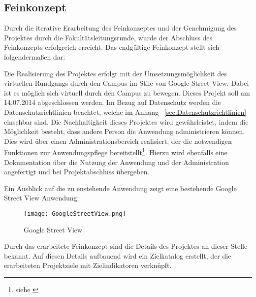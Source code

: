 \subsection{Feinkonzept}
\label{sec:Feinkonzept}

Durch die iterative Erarbeitung des Feinkonzeptes und der Genehmigung des
Projektes durch die Fakultätsleitungsrunde, wurde der Abschluss des Feinkonzepts
erfolgreich erreicht. Das endgültige Feinkonzept stellt sich folgendermaßen dar:

Die Realisierung des Projektes erfolgt mit der Umsetzungsmöglichkeit des
virtuellen Rundgangs durch den Campus im Stile von Google Street View. Dabei ist
es möglich sich virtuell durch den Campus zu bewegen. Dieses Projekt soll am
14.07.2014 abgeschlossen werden. Im Bezug auf Datenschutz werden die
Datenschutzrichtlinien beachtet, welche im Anhang ~\ref{sec:Datenschutzrichtlinien} einsehbar sind. Die
Nachhaltigkeit dieses Projektes wird gewährleistet, indem die Möglichkeit
besteht, dass andere Person die Anwendung administrieren können. Dies wird über
einen Administrationsbereich realisiert, der die notwendigen Funktionen zur
Anwendungspflege bereitstellt\footnote{siehe \citet{lastenheft2013}}. Hierzu
wird ebenfalls eine Dokumentation über die Nutzung der Anwendung und der
Administration angefertigt und bei Projektabschluss übergeben.

Ein Ausblick auf die zu enstehende Anwendung zeigt eine bestehende 
Google Street View Anwendung:

\clearpage
\begin{figure}[htb] 
\centering
\texttt{[image: GoogleStreetView.png]}
\caption[Google Street View]{Google Street View\protect\footnotemark}
\label{fig:GoogleStreetView}
\end{figure}

Durch das erarbeitete Feinkonzept sind die Details des Projektes an dieser Stelle bekannt.
Auf diesen Details aufbauend wird ein Zielkatalog erstellt, der die erarbeiteten Projektziele
mit Zielindikatoren verknüpft.